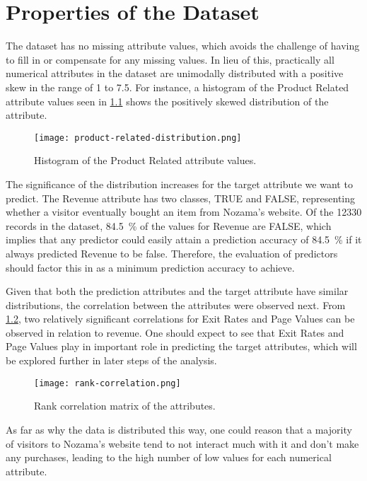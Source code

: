 \documentclass[../cmpe-251-project-report.tex]{subfiles}
\begin{document}
  \chapter{Properties of the Dataset}
  \label{ch:dataset-properties}
  The dataset has no missing attribute values, which avoids the challenge of having to fill in or compensate for any missing values. In lieu of this, practically all numerical attributes in the dataset are unimodally distributed with a positive skew in the range of 1 to 7.5. For instance, a histogram of the Product Related attribute values seen in \cref{fig:attribute-distribution} shows the positively skewed distribution of the attribute.
  \begin{figure}
    \texttt{[image: product-related-distribution.png]}
    \caption{Histogram of the Product Related attribute values.}
    \label{fig:attribute-distribution}
  \end{figure}
  The significance of the distribution increases for the target attribute we want to predict. The Revenue attribute has two classes, TRUE and FALSE, representing whether a visitor eventually bought an item from Nozama's website. Of the \num{12330} records in the dataset, \qty{84.5}{\percent} of the values for Revenue are FALSE, which implies that any predictor could easily attain a prediction accuracy of \qty{84.5}{\percent} if it always predicted Revenue to be false. Therefore, the evaluation of predictors should factor this in as a minimum prediction accuracy to achieve.

  Given that both the prediction attributes and the target attribute have similar distributions, the correlation between the attributes were observed next. From \cref{fig:rank-correlation}, two relatively significant correlations for Exit Rates and Page Values can be observed in relation to revenue. One should expect to see that Exit Rates and Page Values play in important role in predicting the target attributes, which will be explored further in later steps of the analysis.
  \begin{figure}
    \texttt{[image: rank-correlation.png]}
    \caption{Rank correlation matrix of the attributes.}
    \label{fig:rank-correlation}
  \end{figure}
  As far as why the data is distributed this way, one could reason that a majority of visitors to Nozama's website tend to not interact much with it and don't make any purchases, leading to the high number of low values for each numerical attribute.
\end{document}
